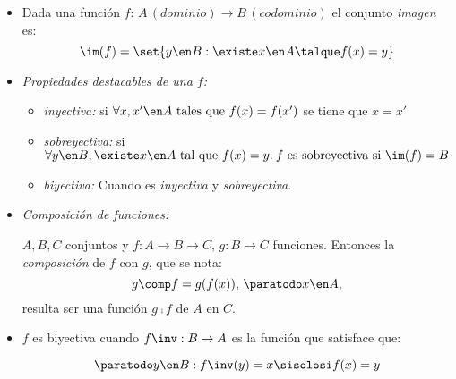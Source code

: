 \begin{itemize}[label={\tiny{}}]
\begin{itemize}[label=\tiny{}]
                \begin{itemize}[label=\tiny{}]
                  \item Dada una función $f:\, A\,(dominio) \to B\,(codominio)$
                        el conjunto \textit{imagen} es:
                        $$
                          \im(f)= \set{y \en B : \existe x \en A \talque f(x) = y}
                        $$

                  \item \textit{Propiedades destacables de una $f$:}
                        \begin{itemize}[label=\tiny{}]
                          \item \textit{inyectiva:} si $\forall x, x' \en A \text{ tales que } f(x) = f(x')$ se tiene que $ x = x'$
                          \item \textit{sobreyectiva:} si $\forall y \en B, \existe x \en A \text{ tal que } f(x) = y.\: f\text{ es sobreyectiva si } \im(f) = B$
                          \item \textit{biyectiva:} Cuando es \textit{inyectiva} y \textit{sobreyectiva}.
                        \end{itemize}

                  \item \textit{Composición de funciones:}\par
                        $A, B, C$ conjuntos y $f: A \to B \to C,\, g: B \to C$ funciones. Entonces la \textit{composición} de $f$ con $g$, que se nota:
                        $$
                          g \comp f = g(f(x)),\, \paratodo x \en A,
                        $$
                        resulta ser una función $g \comp f$ de $A$ en $C$.

                  \item $f$ es biyectiva cuando $f\inv : B \to A$ es la función que satisface que:\par
                        $$
                          \paratodo y \en B: f\inv(y) = x \sisolosi f(x) = y
                        $$
                \end{itemize}
        \end{itemize}
\end{itemize}
